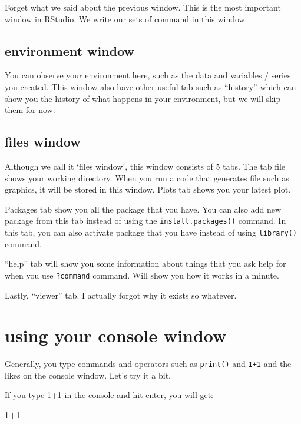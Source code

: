 \documentclass[
]{book}
\newenvironment{Shaded}{\begin{snugshade}}{\end{snugshade}}
\newcommand{\DecValTok}[1]{\textcolor[rgb]{0.00,0.00,0.81}{#1}}
\newcommand{\OperatorTok}[1]{\textcolor[rgb]{0.81,0.36,0.00}{\textbf{#1}}}
\begin{document}
Forget what we said about the previous window. This is the most important window in RStudio. We write our sets of command in this window

\hypertarget{environment-window}{%
\subsection{environment window}\label{environment-window}}

You can observe your environment here, such as the data and variables / series you created. This window also have other useful tab such as ``history'' which can show you the history of what happens in your environment, but we will skip them for now.

\hypertarget{files-window}{%
\subsection{files window}\label{files-window}}

Although we call it `files window', this window consists of 5 tabs. The tab file shows your working directory. When you run a code that generates file such as graphics, it will be stored in this window. Plots tab shows you your latest plot.

Packages tab show you all the package that you have. You can also add new package from this tab instead of using the \texttt{install.packages()} command. In this tab, you can also activate package that you have instead of using \texttt{library()} command.

``help'' tab will show you some information about things that you ask help for when you use \texttt{?\textquotesingle{}command\textquotesingle{}} command. Will show you how it works in a minute.

Lastly, ``viewer'' tab. I actually forgot why it exists so whatever.

\hypertarget{using-your-console-window}{%
\section{using your console window}\label{using-your-console-window}}

Generally, you type commands and operators such as \texttt{print()} and \texttt{1+1} and the likes on the console window. Let's try it a bit.

If you type 1+1 in the console and hit enter, you will get:

\begin{Shaded}
\begin{Highlighting}[]
\DecValTok{1}\OperatorTok{+}\DecValTok{1}
\end{Highlighting}
\end{Shaded}
\end{document}
